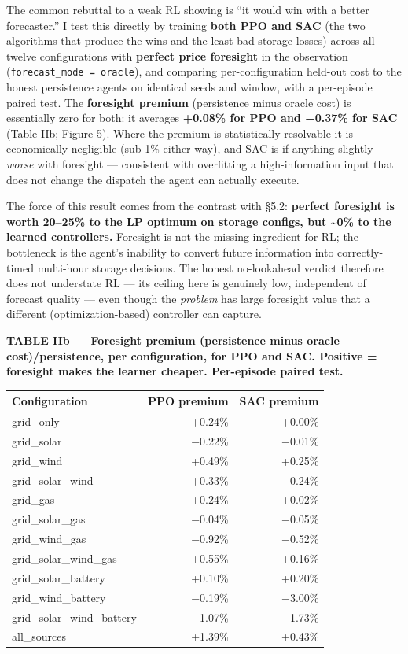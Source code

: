 \documentclass[
  11pt,
]{article}
\newcounter{none} %
\begin{document}
The common rebuttal to a weak RL showing is ``it would win with a better
forecaster.'' I test this directly by training \textbf{both PPO and SAC}
(the two algorithms that produce the wins and the least-bad storage
losses) across all twelve configurations with \textbf{perfect price
foresight} in the observation (\texttt{forecast\_mode\ =\ oracle}), and
comparing per-configuration held-out cost to the honest persistence
agents on identical seeds and window, with a per-episode paired test.
The \textbf{foresight premium} (persistence minus oracle cost) is
essentially zero for both: it averages \textbf{+0.08\% for PPO and
−0.37\% for SAC} (Table IIb; Figure 5). Where the premium is
statistically resolvable it is economically negligible (sub-1\% either
way), and SAC is if anything slightly \emph{worse} with foresight ---
consistent with overfitting a high-information input that does not
change the dispatch the agent can actually execute.

The force of this result comes from the contrast with §5.2:
\textbf{perfect foresight is worth 20--25\% to the LP optimum on storage
configs, but \textasciitilde0\% to the learned controllers.} Foresight
is not the missing ingredient for RL; the bottleneck is the agent's
inability to convert future information into correctly-timed multi-hour
storage decisions. The honest no-lookahead verdict therefore does not
understate RL --- its ceiling here is genuinely low, independent of
forecast quality --- even though the \emph{problem} has large foresight
value that a different (optimization-based) controller can capture.

\textbf{TABLE IIb --- Foresight premium (persistence minus oracle
cost)/persistence, per configuration, for PPO and SAC. Positive =
foresight makes the learner cheaper. Per-episode paired test.}

{\def\LTcaptype{none} %
\begin{longtable}[]{@{}lrr@{}}
\toprule\noalign{}
Configuration & PPO premium & SAC premium \\
\midrule\noalign{}
\endhead
\bottomrule\noalign{}
\endlastfoot
grid\_only & +0.24\% & +0.00\% \\
grid\_solar & −0.22\% & −0.01\% \\
grid\_wind & +0.49\% & +0.25\% \\
grid\_solar\_wind & +0.33\% & −0.24\% \\
grid\_gas & +0.24\% & +0.02\% \\
grid\_solar\_gas & −0.04\% & −0.05\% \\
grid\_wind\_gas & −0.92\% & −0.52\% \\
grid\_solar\_wind\_gas & +0.55\% & +0.16\% \\
grid\_solar\_battery & +0.10\% & +0.20\% \\
grid\_wind\_battery & −0.19\% & −3.00\% \\
grid\_solar\_wind\_battery & −1.07\% & −1.73\% \\
all\_sources & +1.39\% & +0.43\% \\
\end{longtable}
}
\end{document}
